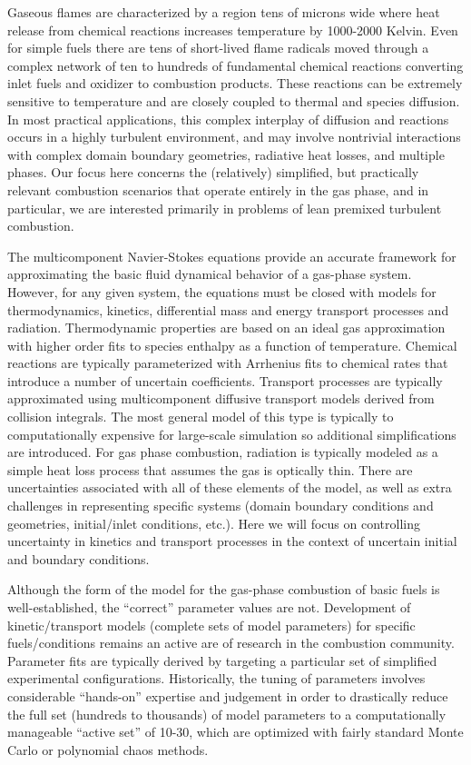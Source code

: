 \documentclass[11pt]{article}
\begin{document}
Gaseous flames are characterized by a region
tens of microns wide where heat release from chemical reactions
increases temperature by 1000-2000 Kelvin.
Even for simple fuels there
are
tens of short-lived flame radicals moved through a complex
network of ten to hundreds of fundamental chemical reactions
converting inlet fuels and oxidizer to combustion products.  
These reactions can be extremely sensitive to
temperature and are closely coupled to thermal and species diffusion.
In most
practical applications, this complex interplay of diffusion and
reactions occurs in a highly turbulent environment, and may involve
nontrivial interactions with complex domain boundary geometries,
radiative heat losses, and multiple phases.  Our focus here concerns
the (relatively) simplified, but practically relevant combustion
scenarios that operate entirely in the gas phase, and in particular,
we are interested primarily in problems of lean premixed turbulent combustion.

The multicomponent Navier-Stokes equations provide an accurate framework for approximating
the basic fluid dynamical behavior of a gas-phase system.
However, for any 
given system, the equations must be closed with models for
thermodynamics,
kinetics, differential mass and energy transport processes and radiation.
Thermodynamic properties are based on an ideal gas approximation with higher order fits
to species enthalpy as a function of temperature.
Chemical reactions are typically parameterized with
Arrhenius fits to chemical rates that introduce a number of uncertain
coefficients.
Transport processes are typically approximated using multicomponent diffusive
transport models derived from collision integrals.  The most general
model of this type is typically to computationally expensive for large-scale
simulation so additional simplifications are introduced.
For gas phase combustion, radiation is typically modeled as a simple heat loss
process that assumes the gas is optically thin.
There are uncertainties associated with all of these elements of the model,
as well as extra challenges in representing specific systems
(domain boundary conditions and geometries, initial\slash inlet
conditions, etc.).
Here we will focus on controlling uncertainty in kinetics and transport processes in the context
of uncertain initial and boundary conditions. 

Although the form of the model for the gas-phase combustion of basic
fuels is well-established,
the ``correct'' parameter values are not.
Development of kinetic\slash transport models (complete sets of model parameters)
for specific fuels\slash conditions remains
an active are of research in the combustion community.
Parameter fits are typically derived by targeting
a particular set of
simplified experimental configurations.  Historically, the tuning of parameters
involves considerable ``hands-on'' expertise and judgement in
order to drastically reduce the full set (hundreds to thousands) of
model parameters to a computationally manageable ``active set'' of
10-30, which are optimized with fairly standard Monte Carlo or
polynomial chaos methods.
\end{document}
